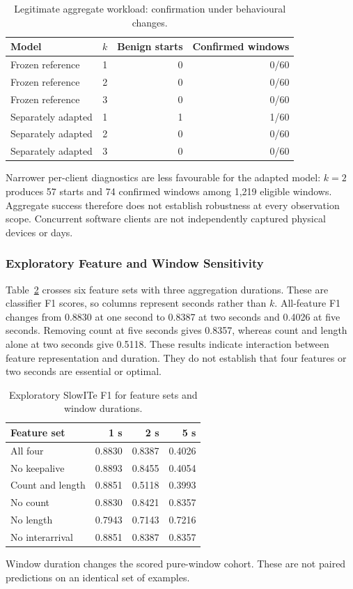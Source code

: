 \documentclass[conference]{IEEEtran}
\begin{document}
\begin{table}[t]
\centering
\caption{Legitimate aggregate workload: confirmation under behavioural changes.}
\label{tab:benign_stress}
\begin{tabularx}{\textwidth}{>{\raggedright\arraybackslash}Xrrr}
\toprule
Model & $k$ & Benign starts & Confirmed windows \\
\midrule
Frozen reference & 1 & 0 & 0/60 \\
Frozen reference & 2 & 0 & 0/60 \\
Frozen reference & 3 & 0 & 0/60 \\
Separately adapted & 1 & 1 & 1/60 \\
Separately adapted & 2 & 0 & 0/60 \\
Separately adapted & 3 & 0 & 0/60 \\
\bottomrule
\end{tabularx}
\end{table}

Narrower per-client diagnostics are less favourable for the adapted
model: $k=2$ produces 57 starts and 74 confirmed windows among 1,219
eligible windows. Aggregate success therefore does not establish
robustness at every observation scope. Concurrent software clients
are not independently captured physical devices or days.

\subsubsection{Exploratory Feature and Window Sensitivity}

Table~\ref{tab:sensitivity} crosses six feature sets with three
aggregation durations. These are classifier F1 scores, so columns
represent seconds rather than $k$. All-feature F1 changes from 0.8830
at one second to 0.8387 at two seconds and 0.4026 at five seconds.
Removing count at five seconds gives 0.8357, whereas count and length
alone at two seconds give 0.5118. These results indicate interaction
between feature representation and duration. They do not establish
that four features or two seconds are essential or optimal.

\begin{table}[t]
\centering
\caption{Exploratory SlowITe F1 for feature sets and window durations.}
\label{tab:sensitivity}
\begin{tabular}{lrrr}
\toprule
Feature set & 1 s & 2 s & 5 s \\
\midrule
All four & 0.8830 & 0.8387 & 0.4026 \\
No keepalive & 0.8893 & 0.8455 & 0.4054 \\
Count and length & 0.8851 & 0.5118 & 0.3993 \\
No count & 0.8830 & 0.8421 & 0.8357 \\
No length & 0.7943 & 0.7143 & 0.7216 \\
No interarrival & 0.8851 & 0.8387 & 0.8357 \\
\bottomrule
\end{tabular}
\smallskip
\parbox{\columnwidth}{\footnotesize Window duration changes the scored pure-window cohort. These are not paired predictions on an identical set of examples.}
\end{table}
\end{document}
